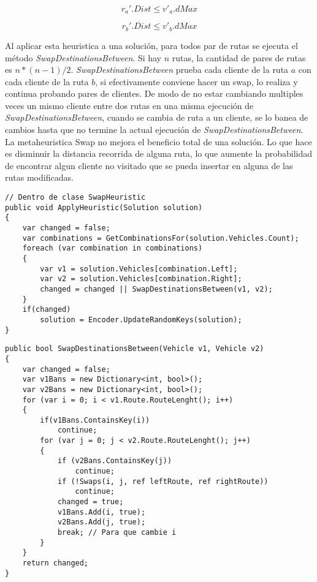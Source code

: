 \begin{equation*}
r_a'.Dist \leq v'_a.dMax
\end{equation*}

\begin{equation*}
r_b'.Dist \leq v'_b.dMax
\end{equation*}

Al aplicar esta heuristica a una solución, para todos par de rutas se ejecuta el método \textit{SwapDestinationsBetween}. Si hay $n$ rutas, la cantidad de pares de rutas es $n * (n-1) / 2$. \textit{SwapDestinationsBetween} prueba cada cliente de la ruta $a$ con cada cliente de la ruta $b$, si efectivamente conviene hacer un swap, lo realiza y continua probando pares de clientes. De modo de no estar cambiando multiples veces un mismo cliente entre dos rutas en una misma ejecución de \textit{SwapDestinationsBetween}, cuando se cambia de ruta a un cliente, se lo banea de cambios hasta que no termine la actual ejecución de \textit{SwapDestinationsBetween}. La metaheuristica Swap no mejora el beneficio total de una solución. Lo que hace es disminuir la distancia recorrida de alguna ruta, lo que aumente la probabilidad de encontrar algun cliente no visitado que se pueda insertar en alguna de las rutas modificadas.

\bigskip

\begin{minipage}{\textwidth}
\begin{lstlisting}
// Dentro de clase SwapHeuristic
public void ApplyHeuristic(Solution solution)
{
	var changed = false;
	var combinations = GetCombinationsFor(solution.Vehicles.Count);
	foreach (var combination in combinations)
	{
		var v1 = solution.Vehicles[combination.Left];
		var v2 = solution.Vehicles[combination.Right];
		changed = changed || SwapDestinationsBetween(v1, v2);
	}
	if(changed)
		solution = Encoder.UpdateRandomKeys(solution);
}
\end{lstlisting}
\end{minipage}

\begin{minipage}{\textwidth}
\begin{lstlisting}
public bool SwapDestinationsBetween(Vehicle v1, Vehicle v2)
{
	var changed = false;
	var v1Bans = new Dictionary<int, bool>();
	var v2Bans = new Dictionary<int, bool>();
	for (var i = 0; i < v1.Route.RouteLenght(); i++)
	{
		if(v1Bans.ContainsKey(i)) 
			continue;
		for (var j = 0; j < v2.Route.RouteLenght(); j++)
		{
			if (v2Bans.ContainsKey(j)) 
				continue;
			if (!Swaps(i, j, ref leftRoute, ref rightRoute)) 
				continue;
			changed = true;
			v1Bans.Add(i, true);
			v2Bans.Add(j, true);
			break; // Para que cambie i
		}
	}
	return changed;
}
\end{lstlisting}
\end{minipage}

